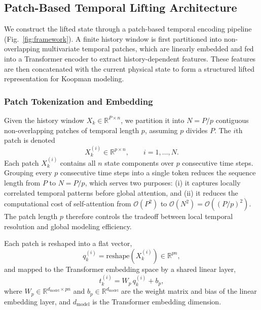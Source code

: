 \documentclass[journal]{IEEEtran}
\begin{document}
\subsection{Patch-Based Temporal Lifting Architecture}
\label{sec:temporal_lifting}

We construct the lifted state through a patch-based temporal encoding pipeline (Fig.~\ref{fig:framework}). A finite history window is first partitioned into non-overlapping multivariate temporal patches, which are linearly embedded and fed into a Transformer encoder to extract history-dependent features. These features are then concatenated with the current physical state to form a structured lifted representation for Koopman modeling.

\subsubsection{Patch Tokenization and Embedding}

Given the history window $X_k \in \mathbb{R}^{P\times n}$, we partition it into $N=P/p$ contiguous non-overlapping patches of temporal length $p$, assuming $p$ divides $P$. The $i$th patch is denoted
\begin{equation}
    X_k^{(i)} \in \mathbb{R}^{p\times n}, \qquad i=1,\ldots,N.
\end{equation}
Each patch $X_k^{(i)}$ contains all $n$ state components over $p$ consecutive time steps. Grouping every $p$ consecutive time steps into a single token reduces the sequence length from $P$ to $N = P/p$, which serves two purposes: (i) it captures locally correlated temporal patterns before global attention, and (ii) it reduces the computational cost of self-attention from $\mathcal{O}(P^2)$ to $\mathcal{O}(N^2) = \mathcal{O}((P/p)^2)$. The patch length $p$ therefore controls the tradeoff between local temporal resolution and global modeling efficiency.

Each patch is reshaped into a flat vector,
\begin{equation}
    q_k^{(i)} = \mathrm{reshape}(X_k^{(i)}) \in \mathbb{R}^{pn},
    \label{eq:patch_reshape}
\end{equation}
and mapped to the Transformer embedding space by a shared linear layer,
\begin{equation}
    t_k^{(i)} = W_p\, q_k^{(i)} + b_p,
    \label{eq:patch_embedding}
\end{equation}
where $W_p \in \mathbb{R}^{d_{\mathrm{model}} \times pn}$ and $b_p \in \mathbb{R}^{d_{\mathrm{model}}}$ are the weight matrix and bias of the linear embedding layer, and $d_{\mathrm{model}}$ is the Transformer embedding dimension.
\end{document}
